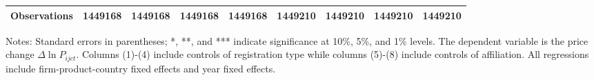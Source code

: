 \documentclass[12pt]{article}
\begin{document}
\begin{table}
\begin{threeparttable}
\begin{tabular}{lcccccccc}
			Observations & 1449168 & 1449168 & 1449168 & 1449168 & 1449210 & 1449210 & 1449210 & 1449210\\
			\bottomrule
		\end{tabular}
		\begin{tablenotes}
			\footnotesize
			\item[Notes:] Standard errors in parentheses; *, **, and *** indicate significance at 10\%, 5\%, and 1\% levels. The dependent variable is the price change $\Delta \ln P_{ijct}$. Columns (1)-(4) include controls of registration type while columns (5)-(8) include controls of affiliation. All regressions include firm-product-country fixed effects and year fixed effects.
		\end{tablenotes}
	\end{threeparttable}
	\label{tab.robust.ownership}
\end{table}
\end{document}
